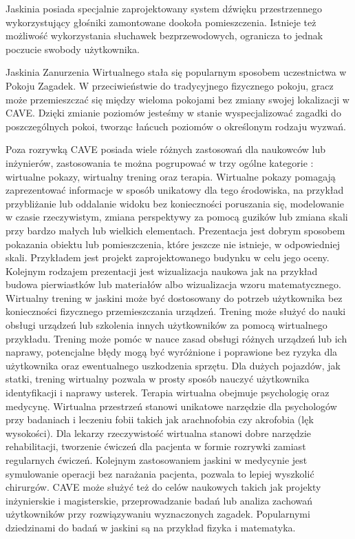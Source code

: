 Jaskinia posiada specjalnie zaprojektowany system dźwięku przestrzennego wykorzystujący głośniki zamontowane dookoła pomieszczenia. Istnieje też możliwość wykorzystania słuchawek bezprzewodowych, ogranicza to jednak poczucie swobody użytkownika.

Jaskinia Zanurzenia Wirtualnego stała się popularnym sposobem uczestnictwa w Pokoju Zagadek. W przeciwieństwie do tradycyjnego fizycznego pokoju, gracz może przemieszczać się między wieloma pokojami bez zmiany swojej lokalizacji w CAVE. Dzięki zmianie poziomów jesteśmy w stanie wyspecjalizować zagadki do poszczególnych pokoi, tworząc łańcuch poziomów o określonym rodzaju wyzwań.

Poza rozrywką CAVE posiada wiele różnych zastosowań dla naukowców lub inżynierów, zastosowania te można pogrupować w trzy ogólne kategorie : wirtualne pokazy, wirtualny trening oraz terapia.
Wirtualne pokazy pomagają zaprezentować informacje w sposób unikatowy dla tego środowiska, na przykład przybliżanie lub oddalanie widoku bez konieczności poruszania się, modelowanie w czasie rzeczywistym, zmiana perspektywy za pomocą guzików lub zmiana skali przy bardzo małych lub wielkich elementach.
Prezentacja jest dobrym sposobem pokazania obiektu lub pomieszczenia, które jeszcze nie istnieje, w odpowiedniej skali. Przykładem jest projekt zaprojektowanego budynku w celu jego oceny. Kolejnym rodzajem prezentacji jest wizualizacja naukowa jak na przykład budowa pierwiastków lub materiałów albo wizualizacja wzoru matematycznego.
Wirtualny trening w jaskini może być dostosowany do potrzeb użytkownika bez konieczności fizycznego przemieszczania urządzeń. Trening może służyć do nauki obsługi urządzeń lub szkolenia innych użytkowników za pomocą wirtualnego przykładu.
Trening może pomóc w nauce zasad obsługi różnych urządzeń lub ich naprawy, potencjalne błędy mogą być wyróżnione i poprawione bez ryzyka dla użytkownika oraz ewentualnego uszkodzenia sprzętu. Dla dużych pojazdów, jak statki, trening wirtualny pozwala w prosty sposób nauczyć użytkownika identyfikacji i naprawy usterek.
Terapia wirtualna obejmuje psychologię oraz medycynę. Wirtualna przestrzeń stanowi unikatowe narzędzie dla psychologów przy badaniach i leczeniu fobii takich jak arachnofobia czy akrofobia (lęk wysokości). Dla lekarzy rzeczywistość wirtualna stanowi dobre narzędzie rehabilitacji, tworzenie ćwiczeń dla pacjenta w formie rozrywki zamiast regularnych ćwiczeń. Kolejnym zastosowaniem jaskini w medycynie jest symulowanie operacji bez narażania pacjenta, pozwala to lepiej wyszkolić chirurgów.
CAVE może służyć też do celów naukowych takich jak projekty inżynierskie i magisterskie, przeprowadzanie badań lub analiza zachowań użytkowników przy rozwiązywaniu wyznaczonych zagadek.
Popularnymi dziedzinami do badań w jaskini są na przykład fizyka i matematyka. 




